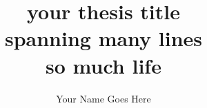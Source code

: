 \documentclass[
12pt         %
,oneside     
]{mythesis}
\title{your thesis title \\ spanning many lines \\ so much life}
\author{Your Name Goes Here}
\begin{document}
\maketitle






\allcontents
\cleardoublepage
\mainbody






\formatbibliography



\formatappendices

\end{document}
